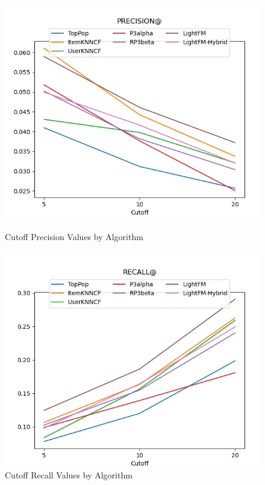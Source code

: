 \begin{figure}[h!]
    \centering
    \begin{minipage}{0.48\textwidth}
        \centering
        \includegraphics[width=\linewidth]{images/precision_plot.png}
        \caption{Cutoff Precision Values by Algorithm}
        \label{fig:precision}
    \end{minipage}\hfill
    \begin{minipage}{0.48\textwidth}
        \centering
        \includegraphics[width=\linewidth]{images/recall_plot.png}
        \caption{Cutoff Recall Values by Algorithm}
        \label{fig:recall}
    \end{minipage}
\end{figure}


